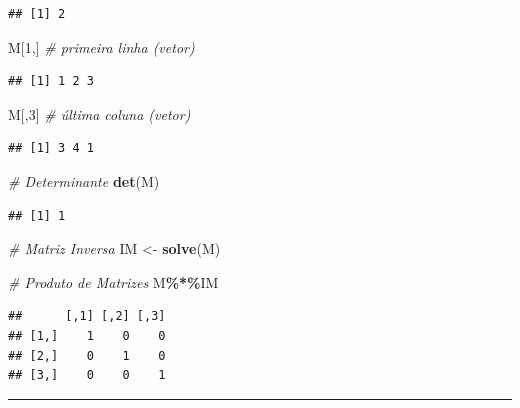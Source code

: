 \documentclass[
]{book}
\newenvironment{Shaded}{\begin{snugshade}}{\end{snugshade}}
\newcommand{\CommentTok}[1]{\textcolor[rgb]{0.56,0.35,0.01}{\textit{#1}}}
\newcommand{\DecValTok}[1]{\textcolor[rgb]{0.00,0.00,0.81}{#1}}
\newcommand{\FunctionTok}[1]{\textcolor[rgb]{0.13,0.29,0.53}{\textbf{#1}}}
\newcommand{\NormalTok}[1]{#1}
\newcommand{\OtherTok}[1]{\textcolor[rgb]{0.56,0.35,0.01}{#1}}
\newcommand{\SpecialCharTok}[1]{\textcolor[rgb]{0.81,0.36,0.00}{\textbf{#1}}}
\begin{document}
\begin{verbatim}
## [1] 2
\end{verbatim}

\begin{Shaded}
\begin{Highlighting}[]
\NormalTok{M[}\DecValTok{1}\NormalTok{,] }\CommentTok{\# primeira linha (vetor)}
\end{Highlighting}
\end{Shaded}

\begin{verbatim}
## [1] 1 2 3
\end{verbatim}

\begin{Shaded}
\begin{Highlighting}[]
\NormalTok{M[,}\DecValTok{3}\NormalTok{] }\CommentTok{\# última coluna (vetor)}
\end{Highlighting}
\end{Shaded}

\begin{verbatim}
## [1] 3 4 1
\end{verbatim}

\begin{Shaded}
\begin{Highlighting}[]
\CommentTok{\# Determinante}
\FunctionTok{det}\NormalTok{(M)}
\end{Highlighting}
\end{Shaded}

\begin{verbatim}
## [1] 1
\end{verbatim}

\begin{Shaded}
\begin{Highlighting}[]
\CommentTok{\# Matriz Inversa}
\NormalTok{IM }\OtherTok{\textless{}{-}} \FunctionTok{solve}\NormalTok{(M)}

\CommentTok{\# Produto de Matrizes}
\NormalTok{M}\SpecialCharTok{\%*\%}\NormalTok{IM}
\end{Highlighting}
\end{Shaded}

\begin{verbatim}
##      [,1] [,2] [,3]
## [1,]    1    0    0
## [2,]    0    1    0
## [3,]    0    0    1
\end{verbatim}

\begin{center}\rule{0.5\linewidth}{0.5pt}\end{center}
\end{document}
